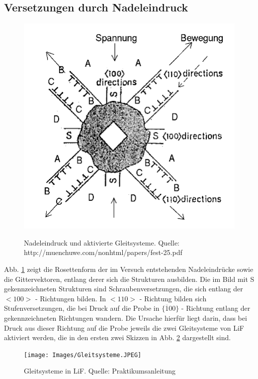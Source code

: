     \subsection{Versetzungen durch Nadeleindruck}
	\begin{figure}[H]
            \centering
            \includegraphics{Images/Question3.PNG}
            \label{FigNadel}
            \caption{Nadeleindruck und aktivierte Gleitsysteme. Quelle: http://muenchuwe.com/nonhtml/papers/fest-25.pdf}
        \end{figure}
	
	Abb. \ref{FigNadel} zeigt die Rosettenform der im Versuch entstehenden Nadeleindrücke sowie die Gittervektoren, entlang derer sich die Strukturen ausbilden. 
	Die im Bild mit S gekennzeichneten Strukturen sind Schraubenversetzungen, die sich entlang der $<100>$ - Richtungen bilden. In $<110>$ - Richtung bilden sich
	Stufenversetzungen, die bei Druck auf die Probe in $\{ \overline{1}00\}$ - Richtung entlang der gekennzeichneten Richtungen wandern. Die Ursache hierfür liegt
	darin, dass bei Druck aus dieser Richtung auf die Probe jeweils die zwei Gleitsysteme von LiF aktiviert werden, die in den ersten zwei Skizzen in Abb. 
	\ref{FigGleitGel} dargestellt sind.
	

	\begin{figure}[H]
            \centering
            \texttt{[image: Images/Gleitsysteme.JPEG]}
            \label{FigGleitGel}
            \caption{Gleitsysteme in LiF. Quelle: Praktikumsanleitung}
        \end{figure}


	